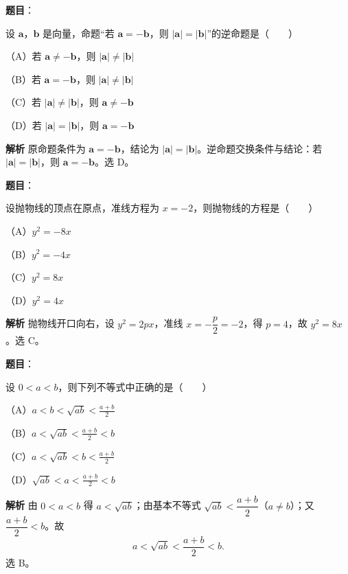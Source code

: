
\begin{answer}

\textbf{题目}：

设 $\boldsymbol a$，$\boldsymbol b$ 是向量，命题“若 $\boldsymbol a=-\boldsymbol b$，则 $|\boldsymbol a|=|\boldsymbol b|$”的逆命题是\mbox{（　　）}

（A）若 $\boldsymbol a\ne-\boldsymbol b$，则 $|\boldsymbol a|\ne|\boldsymbol b|$

（B）若 $\boldsymbol a=-\boldsymbol b$，则 $|\boldsymbol a|\ne|\boldsymbol b|$

（C）若 $|\boldsymbol a|\ne|\boldsymbol b|$，则 $\boldsymbol a\ne-\boldsymbol b$

（D）若 $|\boldsymbol a|=|\boldsymbol b|$，则 $\boldsymbol a=-\boldsymbol b$

\textbf{解析}
原命题条件为 $\boldsymbol a=-\boldsymbol b$，结论为 $|\boldsymbol a|=|\boldsymbol b|$。逆命题交换条件与结论：若 $|\boldsymbol a|=|\boldsymbol b|$，则 $\boldsymbol a=-\boldsymbol b$。选 D。


\end{answer}
\begin{answer}

\textbf{题目}：

设抛物线的顶点在原点，准线方程为 $x=-2$，则抛物线的方程是\mbox{（　　）}

（A）$y^2=-8x$

（B）$y^2=-4x$

（C）$y^2=8x$

（D）$y^2=4x$

\textbf{解析}
抛物线开口向右，设 $y^2=2px$，准线 $x=-\dfrac p2=-2$，得 $p=4$，故 $y^2=8x$。选 C。


\end{answer}
\begin{answer}

\textbf{题目}：

设 $0<a<b$，则下列不等式中正确的是\mbox{（　　）}

（A）$a<b<\sqrt{ab}<\frac{a+b}2$

（B）$a<\sqrt{ab}<\frac{a+b}2<b$

（C）$a<\sqrt{ab}<b<\frac{a+b}2$

（D）$\sqrt{ab}<a<\frac{a+b}2<b$

\textbf{解析}
由 $0<a<b$ 得 $a<\sqrt{ab}$；由基本不等式 $\sqrt{ab}<\dfrac{a+b}2$（$a\ne b$）；又 $\dfrac{a+b}2<b$。故
\nopagebreak[4]
\[a<\sqrt{ab}<\frac{a+b}2<b.\]
选 B。


\end{answer}
